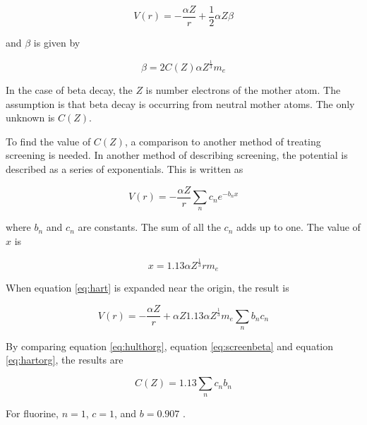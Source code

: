 \documentclass[../MaxHughesThesis.tex]{subfiles}
\begin{document}
\begin{equation}
	V(r) = -\frac{\alpha Z}{r} + \frac{1}{2}\alpha Z \beta
	\label{eq:hulthorg}
\end{equation}

and $\beta$ is given by \cite{Buh84} %
	
\begin{equation}
	\beta = 2C(Z)\alpha Z^{\frac{1}{3}} m_{e}
	\label{eq:screenbeta}
\end{equation}

In the case of beta decay, the $Z$ is number electrons of the mother atom.
The assumption is that beta decay is occurring from neutral mother atoms.
The only unknown is $C(Z)$.

To find the value of $C(Z)$, a comparison to another method of treating screening is needed.
In another method of describing screening, the potential is described as a series of exponentials.
This is written as \cite{Bya56} %

\begin{equation}
	V(r) = -\frac{\alpha Z}{r}\sum_{n}c_{n}e^{-b_{n} x}
	\label{eq:hart}
\end{equation}

where $b_{n}$ and $c_{n}$ are constants.
The sum of all the $c_{n}$ adds up to one.
The value of $x$ is \cite{Bya56} %

\begin{equation}
	x = 1.13 \alpha Z^{\frac{1}{3}} r m_{e}
	\label{eq:screeningx}
\end{equation}

When equation \ref{eq:hart} is expanded near the origin, the result is %

\begin{equation}
	V(r) = - \frac{\alpha Z}{r} + \alpha Z 1.13 \alpha Z^{\frac{1}{3}} m_{e} \sum_{n} b_{n} c_{n}
	\label{eq:hartorg}
\end{equation}

By comparing equation \ref{eq:hulthorg}, equation \ref{eq:screenbeta} and equation \ref{eq:hartorg}, the results are %

\begin{equation}
	C(Z) = 1.13 \sum_{n} c_{n} b_{n}
	\label{eq:betaanswer}
\end{equation} 

For fluorine, $n = 1$, $c = 1$, and $b = 0.907$ \cite{Bya56}.
\end{document}

